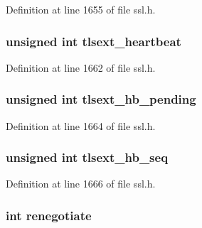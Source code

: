 Definition at line 1655 of file ssl.\+h.

\subsubsection[{\texorpdfstring{tlsext\+\_\+heartbeat}{tlsext_heartbeat}}]{\setlength{\rightskip}{0pt plus 5cm}unsigned int tlsext\+\_\+heartbeat}\hypertarget{structssl__st_a3a59f3296ac282fb5a85097662200982}{}\label{structssl__st_a3a59f3296ac282fb5a85097662200982}


Definition at line 1662 of file ssl.\+h.

\subsubsection[{\texorpdfstring{tlsext\+\_\+hb\+\_\+pending}{tlsext_hb_pending}}]{\setlength{\rightskip}{0pt plus 5cm}unsigned int tlsext\+\_\+hb\+\_\+pending}\hypertarget{structssl__st_a3f9406b42169b3525ce4290aac484273}{}\label{structssl__st_a3f9406b42169b3525ce4290aac484273}


Definition at line 1664 of file ssl.\+h.

\subsubsection[{\texorpdfstring{tlsext\+\_\+hb\+\_\+seq}{tlsext_hb_seq}}]{\setlength{\rightskip}{0pt plus 5cm}unsigned int tlsext\+\_\+hb\+\_\+seq}\hypertarget{structssl__st_aebe5f879f3e7848dd03f78ab2b489a78}{}\label{structssl__st_aebe5f879f3e7848dd03f78ab2b489a78}


Definition at line 1666 of file ssl.\+h.

\subsubsection[{\texorpdfstring{renegotiate}{renegotiate}}]{\setlength{\rightskip}{0pt plus 5cm}int renegotiate}\hypertarget{structssl__st_a33239609244fa68ad9876fb8a7c05917}{}\label{structssl__st_a33239609244fa68ad9876fb8a7c05917}


